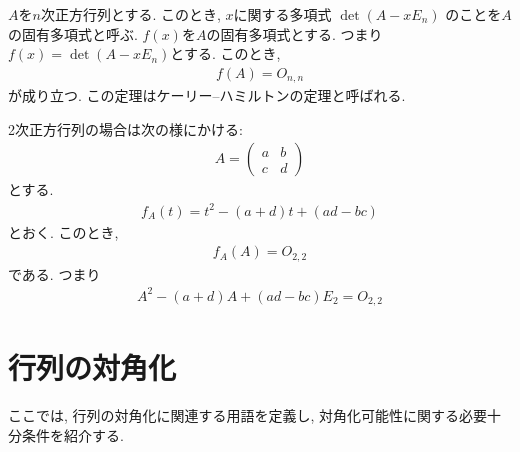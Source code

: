 \begin{remark}
  \label{thm:cht:general}
  $A$を$n$次正方行列とする.
  このとき,
  $x$に関する多項式
  $\det(A-xE_n)$
  のことを$A$の固有多項式と呼ぶ.
  $f(x)$を$A$の固有多項式とする.
  つまり $f(x)=\det(A-xE_n)$とする.
  このとき,
  \begin{align*}
    f(A)=O_{n,n}
  \end{align*}
  が成り立つ.
  この定理はケーリー--ハミルトンの定理と呼ばれる.
\end{remark}
\begin{remark}
    2次正方行列の場合は次の様にかける:
  \label{thm:cht:2dim}
  \begin{align*}
    A=
    \begin{pmatrix}
      a&b\\c&d
    \end{pmatrix}
  \end{align*}
  とする.
  \begin{align*}
    f_A(t)=t^2-(a+d)t+(ad-bc)
  \end{align*}
  とおく. このとき,
  \begin{align*}
    f_A(A)=O_{2,2}
  \end{align*}
  である. つまり
  \begin{align*}
    A^2-(a+d)A+(ad-bc)E_2=O_{2,2}
  \end{align*}
\end{remark}

\section{行列の対角化}
ここでは,
行列の対角化に関連する用語を定義し,
対角化可能性に関する必要十分条件を紹介する.

